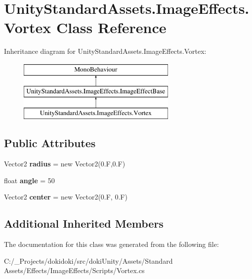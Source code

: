 \hypertarget{class_unity_standard_assets_1_1_image_effects_1_1_vortex}{}\section{Unity\+Standard\+Assets.\+Image\+Effects.\+Vortex Class Reference}
\label{class_unity_standard_assets_1_1_image_effects_1_1_vortex}
Inheritance diagram for Unity\+Standard\+Assets.\+Image\+Effects.\+Vortex\+:\begin{figure}[H]
\begin{center}
\leavevmode
\includegraphics[height=3.000000cm]{class_unity_standard_assets_1_1_image_effects_1_1_vortex}
\end{center}
\end{figure}
\subsection*{Public Attributes}
\begin{DoxyCompactItemize}
\item 
Vector2 {\bfseries radius} = new Vector2(0.\+F,0.\+F)\hypertarget{class_unity_standard_assets_1_1_image_effects_1_1_vortex_a18d4f90d00b4bf29e009dfb6646a5945}{}\label{class_unity_standard_assets_1_1_image_effects_1_1_vortex_a18d4f90d00b4bf29e009dfb6646a5945}

\item 
float {\bfseries angle} = 50\hypertarget{class_unity_standard_assets_1_1_image_effects_1_1_vortex_a58c4a65228a790d11ee0cc53f4695ac5}{}\label{class_unity_standard_assets_1_1_image_effects_1_1_vortex_a58c4a65228a790d11ee0cc53f4695ac5}

\item 
Vector2 {\bfseries center} = new Vector2(0.\+F, 0.\+F)\hypertarget{class_unity_standard_assets_1_1_image_effects_1_1_vortex_aa82b55b306c932271da37a1f23ef9915}{}\label{class_unity_standard_assets_1_1_image_effects_1_1_vortex_aa82b55b306c932271da37a1f23ef9915}

\end{DoxyCompactItemize}
\subsection*{Additional Inherited Members}


The documentation for this class was generated from the following file\+:\begin{DoxyCompactItemize}
\item 
C\+:/\+\_\+\+Projects/dokidoki/src/doki\+Unity/\+Assets/\+Standard Assets/\+Effects/\+Image\+Effects/\+Scripts/Vortex.\+cs\end{DoxyCompactItemize}
